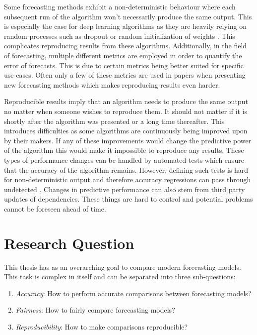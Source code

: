 Some forecasting methods exhibit a non-deterministic behaviour where each subsequent run of the algorithm won’t necessarily produce the same output. This is especially the case for deep learning algorithms as they are heavily relying on random processes such as dropout or random initialization of weights \cite{srivastava_dropout_2014}. This complicates reproducing results from these algorithms. Additionally, in the field of forecasting, multiple different metrics are employed in order to quantify the error of forecasts. This is due to certain metrics being better suited for specific use cases. Often only a few of these metrics are used in papers when presenting new forecasting methods which makes reproducing results even harder.

Reproducible results imply that an algorithm needs to produce the same output no matter when someone wishes to reproduce them. It should not matter if it is shortly after the algorithm was presented or a long time thereafter. This introduces difficulties as some algorithms are continuously being improved upon by their makers. If any of these improvements would change the predictive power of the algorithm this would make it impossible to reproduce any results. These types of performance changes can be handled by automated tests which ensure that the accuracy of the algorithm remains. However, defining such tests is hard for non-deterministic output and therefore accuracy regressions can pass through undetected \cite{gluonts_deepar_github_issue}. Changes in predictive performance can also stem from third party updates of dependencies. These things are hard to control and potential problems cannot be foreseen ahead of time.

\section{Research Question}
This thesis has as an overarching goal to compare modern forecasting models. This task is complex in itself and can be separated into three sub-questions:

\begin{enumerate}
  \item \textit{Accuracy}: How to perform accurate comparisons between forecasting models?
  \item \textit{Fairness}: How to fairly compare forecasting models?
  \item \textit{Reproducibility}: How to make comparisons reproducible?
\end{enumerate}

